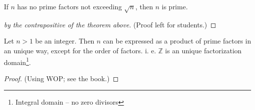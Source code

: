 \begin{corollary}
    If $n$ has no prime factors not exceeding $\sqrt{n}$, then $n$ is prime.
\end{corollary}

\begin{proof}[by the contrapositive of the theorem above]
    (Proof left for students.)
\end{proof}

\begin{theorem}
    Let $n>1$ be an integer. Then $n$ can be expressed as a product of
    prime factors in an unique way, except for the order of factors.
    i. e. $\mathbb{Z}$ is an
    unique factorization domain\footnote{Integral domain -- no zero divisors}.
\end{theorem}
\begin{proof}
    (Using WOP; see the book.)
\end{proof}